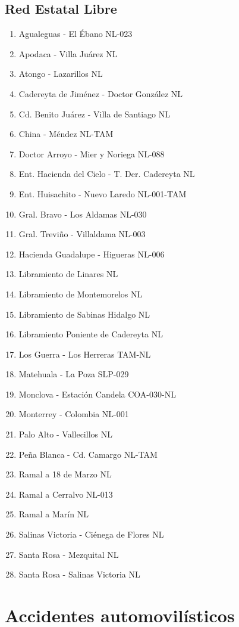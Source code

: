 \documentclass[a4paper]{article}
\begin{document}
\subsection{Red Estatal Libre}
\begin{enumerate}
\item  Agualeguas - El Ébano NL-023 
\item Apodaca - Villa Juárez NL 
\item Atongo - Lazarillos NL 
\item Cadereyta de Jiménez - Doctor González NL 
\item Cd. Benito Juárez - Villa de Santiago NL 
\item China - Méndez NL-TAM 
\item Doctor Arroyo - Mier y Noriega NL-088
\item Ent. Hacienda del Cielo - T. Der. Cadereyta NL 
\item Ent. Huisachito - Nuevo Laredo NL-001-TAM 
\item Gral. Bravo - Los Aldamas NL-030 
\item Gral. Treviño - Villaldama NL-003 
\item Hacienda Guadalupe - Higueras NL-006 
\item Libramiento de Linares NL 
\item Libramiento de Montemorelos NL
\item Libramiento de Sabinas Hidalgo NL 
\item Libramiento Poniente de Cadereyta NL 
\item Los Guerra - Los Herreras TAM-NL 
\item Matehuala - La Poza SLP-029 
\item Monclova - Estación Candela COA-030-NL
\item Monterrey - Colombia NL-001 
\item Palo Alto - Vallecillos NL
\item Peña Blanca - Cd. Camargo NL-TAM
\item Ramal a 18 de Marzo NL 
\item Ramal a Cerralvo NL-013 
\item Ramal a Marín NL 
\item Salinas Victoria - Ciénega de Flores NL 
\item Santa Rosa - Mezquital NL 
\item Santa Rosa - Salinas Victoria NL 
\end{enumerate}
\autocite{SCT}


\section{Accidentes automovilísticos}
\end{document}
